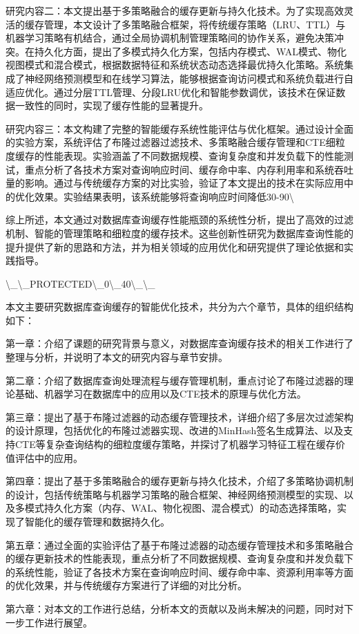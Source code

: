 研究内容二：本文提出基于多策略融合的缓存更新与持久化技术。为了实现高效灵活的缓存管理，本文设计了多策略融合框架，将传统缓存策略（LRU、TTL）与机器学习策略有机结合，通过全局协调机制管理策略间的协作关系，避免决策冲突。在持久化方面，提出了多模式持久化方案，包括内存模式、WAL模式、物化视图模式和混合模式，根据数据特征和系统状态动态选择最优持久化策略。系统集成了神经网络预测模型和在线学习算法，能够根据查询访问模式和系统负载进行自适应优化。通过分层TTL管理、分段LRU优化和智能参数调优，该技术在保证数据一致性的同时，实现了缓存性能的显著提升。

研究内容三：本文构建了完整的智能缓存系统性能评估与优化框架。通过设计全面的实验方案，系统评估了布隆过滤器过滤技术、多策略融合缓存管理和CTE细粒度缓存的性能表现。实验涵盖了不同数据规模、查询复杂度和并发负载下的性能测试，重点分析了各技术方案对查询响应时间、缓存命中率、内存利用率和系统吞吐量的影响。通过与传统缓存方案的对比实验，验证了本文提出的技术在实际应用中的优化效果。实验结果表明，该系统能够将查询响应时间降低30-90\textbackslash{}%

综上所述，本文通过对数据库查询缓存性能瓶颈的系统性分析，提出了高效的过滤机制、智能的管理策略和细粒度的缓存技术。这些创新性研究为数据库查询性能的提升提供了新的思路和方法，并为相关领域的应用优化和研究提供了理论依据和实践指导。

\textbackslash{}_\textbackslash{}_PROTECTED\textbackslash{}_0\textbackslash{}_40\textbackslash{}_\textbackslash{}_

本文主要研究数据库查询缓存的智能优化技术，共分为六个章节，具体的组织结构如下：

第一章：介绍了课题的研究背景与意义，对数据库查询缓存技术的相关工作进行了整理与分析，并说明了本文的研究内容与章节安排。

第二章：介绍了数据库查询处理流程与缓存管理机制，重点讨论了布隆过滤器的理论基础、机器学习在数据库中的应用以及CTE技术的原理与优化方法。

第三章：提出了基于布隆过滤器的动态缓存管理技术，详细介绍了多层次过滤架构的设计原理，包括优化的布隆过滤器实现、改进的MinHash签名生成算法、以及支持CTE等复杂查询结构的细粒度缓存策略，并探讨了机器学习特征工程在缓存价值评估中的应用。

第四章：提出了基于多策略融合的缓存更新与持久化技术，介绍了多策略协调机制的设计，包括传统策略与机器学习策略的融合框架、神经网络预测模型的实现、以及多模式持久化方案（内存、WAL、物化视图、混合模式）的动态选择策略，实现了智能化的缓存管理和数据持久化。

第五章：通过全面的实验评估了基于布隆过滤器的动态缓存管理技术和多策略融合的缓存更新技术的性能表现，重点分析了不同数据规模、查询复杂度和并发负载下的系统性能，验证了各技术方案在查询响应时间、缓存命中率、资源利用率等方面的优化效果，并与传统缓存方案进行了详细的对比分析。

第六章：对本文的工作进行总结，分析本文的贡献以及尚未解决的问题，同时对下一步工作进行展望。